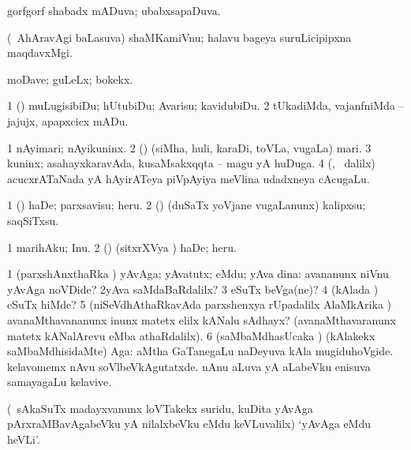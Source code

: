 \bentry
{} 
\gl{\gu}
\bmng
gorfgorf shabadx mADuva; ubabxsapaDuva. 
\emng
\eentry

\bentry
{} 
\gl{\nA}
\expl{}
\bmng
(\kanmu\ AhAravAgi baLasuva) shaMKamiVnu; halavu bageya suruLicipipxna maqdavxMgi. 
\emng
\eentry

\bentry
{}
\gl{\nA}
\expl{}
\bmng
moDave; guLeLx; bokekx. 
\emng
\eentry

\bentry
{} 
\gl{\sakirx}
\expl{}
\bmng
\bnum
\num{1} (\kAparx) muLugisibiDu; hUtubiDu; Avarisu; kavidubiDu. 
\num{2} tUkadiMda, vajanfniMda -- jajujx, apapxcicx mADu. 
\enum
\emng
\eentry

\bentry
{} 
\gl{\nA}
\expl{}
\bmng
\bnum
\num{1} nAyimari; nAyikuninx. 
\num{2} (\pArxparx) (siMha, huli, karaDi, toVLa, \mo vugaLa) mari. 
\num{3} kuninx; asahayxkaravAda, kusaMsakxqqta -- magu yA huDuga. 
\num{4} (\nw, \kanmu\ \bava dalilx) acucxrATaNada yA hAyirATeya piVpAyiya meVlina udadxneya cAcugaLu. 
\enum
\emng
\eentry

\bentry
{} 
\gl{\sakirx}
\expl{}
\bmng
\bnum
\num{1} (\hiV) haDe; parxsavisu; heru. 
\num{2} (\rUpa) (duSaTx yoVjane \mo vugaLanunx) kalipxsu; saqSiTxsu. 
\enum
\emng

\noindent 
\gl{\akirx}
\expl{}
\bmng
\bnum
\num{1} marihAku; Inu. 
\num{2} (\hiV) (sitxrXVya \vi) haDe; heru. 
\enum
\emng
\eentry

\bentry
{} 
\gl{\kirxvi}
\expl{}
\bmng
\bnum
\num{1} (parxshAnxthaRka \kirxvi) yAvAga; yAvatutx; eMdu; yAva dina:  avananunx niVnu yAvAga noVDide? 
\num{2}yAva saMdaBaRdalilx? 
\num{3} eSuTx beVga(ne)? 
\num{4} (kAlada \vi) eSuTx hiMde? 
\num{5} (niSeVdhAthaRkavAda parxshenxya rUpadalilx AlaMkArika \parx)  avanaMthavananunx inunx matetx elilx kANalu sAdhayx? (avanaMthavaranunx matetx kANalArevu eMba athaRdalilx). 
\num{6} (saMbaMdhasUcaka \kirxvi) (kAlakekx saMbaMdhisidaMte) Aga:  aMtha GaTanegaLu naDeyuva kAla mugiduhoVgide.  kelavomemx nAvu soVlbeVkAgutatxde.  nAnu aLuva yA aLabeVku enisuva samayagaLu kelavive. 
\enum
\emng

\noindent 
\gl{\pagu}
\expl{}
\bmng
{} (\kanmu\ sAkaSuTx madayxvanunx loVTakekx suridu, kuDita yAvAga pArxraMBavAgabeVku yA nilalxbeVku eMdu keVLuvalilx) `yAvAga eMdu heVLi'. 
\emng
\eentry

